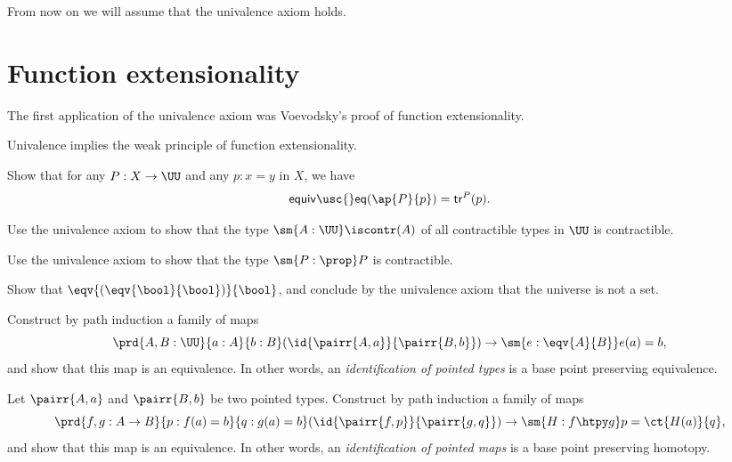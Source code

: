 From now on we will assume that the univalence axiom holds.

\section{Function extensionality}

The first application of the univalence axiom was Voevodsky's proof of function extensionality.

\begin{thm}
Univalence implies the weak principle of function extensionality.
\end{thm}

\begin{exercises}
\item \label{ex:tr_ap} Show that for any $P:X\to \UU$ and any $p:x=y$ in $X$, we have
\begin{equation*}
\mathsf{equiv\usc{}eq}(\ap{P}{p})=\mathsf{tr}^P(p).
\end{equation*}
\item Use the univalence axiom to show that the type $\sm{A:\UU}\iscontr(A)$ of all contractible types in $\UU$ is contractible.
\item Use the univalence axiom to show that the type $\sm{P:\prop}P$ is contractible.
\item Show that $\eqv{(\eqv{\bool}{\bool})}{\bool}$, and conclude by the univalence axiom that the universe is not a set.
\item Construct by path induction a family of maps
\begin{equation*}
\prd{A,B:\UU}{a:A}{b:B} (\id{\pairr{A,a}}{\pairr{B,b}})\to \sm{e:\eqv{A}{B}}e(a)=b,
\end{equation*}
and show that this map is an equivalence. In other words, an \emph{identification of pointed types} is a base point preserving equivalence.
\item Let $\pairr{A,a}$ and $\pairr{B,b}$ be two pointed types. Construct by path induction a family of maps
\begin{equation*}
\prd{f,g:A\to B}{p:f(a)=b}{q:g(a)=b} (\id{\pairr{f,p}}{\pairr{g,q}})\to \sm{H:f\htpy g} p = \ct{H(a)}{q},
\end{equation*}
and show that this map is an equivalence. In other words, an \emph{identification of pointed maps} is a base point preserving homotopy.
\end{exercises}

